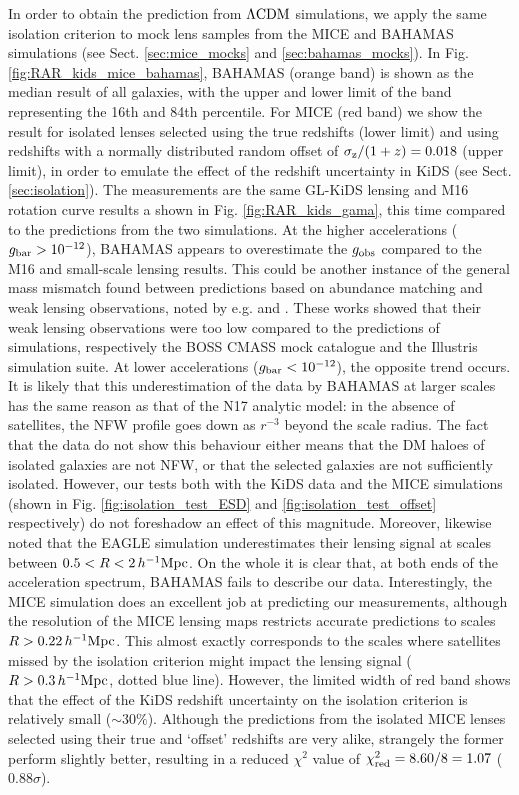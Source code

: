 \documentclass[usenatbib]{mnras}
\newcommand{\hMpc}{\, h^{-1}{\rm{Mpc}} }
\newcommand{\lcdm}{{\rm \Lambda CDM}}
\newcommand{\un}[1]{_{\rm #1}}
\begin{document}
In order to obtain the prediction from $\lcdm$ simulations, we apply the same isolation criterion to mock lens samples from the MICE and BAHAMAS simulations (see Sect. \ref{sec:mice_mocks} and \ref{sec:bahamas_mocks}). In Fig. \ref{fig:RAR_kids_mice_bahamas}, BAHAMAS (orange band) is shown as the median result of all galaxies, with the upper and lower limit of the band representing the 16th and 84th percentile. For MICE (red band) we show the result for isolated lenses selected using the true redshifts (lower limit) and using redshifts with a normally distributed random offset of $\sigma\un{z}/(1+z) = 0.018$ (upper limit), in order to emulate the effect of the redshift uncertainty in KiDS (see Sect. \ref{sec:isolation}). The measurements are the same GL-KiDS lensing and M16 rotation curve results a shown in Fig. \ref{fig:RAR_kids_gama}, this time compared to the predictions from the two simulations.
At the higher accelerations ($g\un{bar}>10^{-12}$), BAHAMAS appears to overestimate the $g\un{obs}$ compared to the M16 and small-scale lensing results. This could be another instance of the general mass mismatch found between predictions based on abundance matching and weak lensing observations, noted by e.g. \cite{leauthaud2017} and \cite{svensmark2019}. These works showed that their weak lensing observations were too low compared to the predictions of simulations, respectively the BOSS CMASS mock catalogue and the Illustris simulation suite. At lower accelerations ($g\un{bar}<10^{-12}$), the opposite trend occurs. It is likely that this underestimation of the data by BAHAMAS at larger scales has the same reason as that of the N17 analytic model: in the absence of satellites, the NFW profile goes down as $r^{-3}$ beyond the scale radius. The fact that the data do not show this behaviour either means that the DM haloes of isolated galaxies are not NFW, or that the selected galaxies are not sufficiently isolated. However, our tests both with the KiDS data and the MICE simulations (shown in Fig. \ref{fig:isolation_test_ESD} and \ref{fig:isolation_test_offset} respectively) do not foreshadow an effect of this magnitude. Moreover, \cite{velliscig2017} likewise noted that the EAGLE simulation underestimates their lensing signal at scales between $0.5 < R < 2 \hMpc$. On the whole it is clear that, at both ends of the acceleration spectrum, BAHAMAS fails to describe our data.
Interestingly, the MICE simulation does an excellent job at predicting our measurements, although the resolution of the MICE lensing maps restricts accurate predictions to scales $R > 0.22 \hMpc$. This almost exactly corresponds to the scales where satellites missed by the isolation criterion might impact the lensing signal ($R > 0.3 \hMpc$, dotted blue line). However, the limited width of red band shows that the effect of the KiDS redshift uncertainty on the isolation criterion is relatively small ($\sim 30\%$). Although the predictions from the isolated MICE lenses selected using their true and `offset' redshifts are very alike, strangely the former perform slightly better, resulting in a reduced $\chi^2$ value of $\chi\un{red}^2 = 8.60 / 8 = 1.07$ ($0.88 \sigma$).
\end{document}
